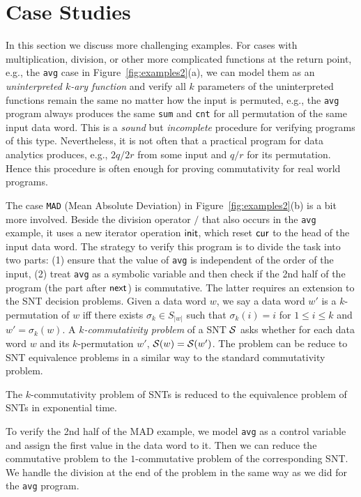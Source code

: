 \section{Case Studies}
\label{sec:cases}


In this section we discuss more challenging examples. 
For cases with multiplication, division, or other more complicated functions at the return point, e.g., the \texttt{avg} case in Figure~\ref{fig:examples2}(a), we can model them as an \emph{uninterpreted $k$-ary function} and verify all $k$ parameters of the uninterpreted functions remain the same no matter how the input is permuted, e.g., the \texttt{avg} program always produces the same \texttt{sum} and \texttt{cnt} for all permutation of the same input data word. This is a \emph{sound} but \emph{incomplete} procedure for verifying programs of this type. Nevertheless, it is not often that a  practical program for data analytics produces, e.g., $2q/2r$ from some input and $q/r$ for its permutation. Hence this procedure is often enough for proving commutativity for real world programs.

The case \texttt{MAD} (Mean Absolute Deviation) in Figure~\ref{fig:examples2}(b) is a bit more involved. Beside the division operator $/$ that also occurs in the \texttt{avg} example, it uses a new iterator operation $\mathsf{init}$, which reset $\mathsf{cur}$ to the head of the input data word. The strategy to verify this program is to divide the task into two parts: (1) ensure that the value of \texttt{avg} is independent of the order of the input, (2) treat \texttt{avg} as a symbolic variable and then check if the 2nd half of the program (the part after $\mathsf{next}$) is commutative. The latter requires an extension to the SNT decision problems. Given a data word $w$, we say a data word $w'$ is a $k$-permutation of $w$ iff there exists $\sigma_k\in S_{|w|}$ such that $\sigma_k(i)=i$ for $1\leq i\leq k$ and $w'=\sigma_k(w)$. A \emph{$k$-commutativity problem} of a SNT ${\mathcal{S} }$ asks whether for each data word $w$ and its $k$-permutation $w'$, ${\mathcal{S} }(w)={\mathcal{S} }(w')$. The problem can be reduce to SNT equivalence problems in a similar way to the standard commutativity problem.

\begin{proposition}\label{prop-snt-kcmm-to-eqv}
	The $k$-commutativity problem of SNTs is reduced to the equivalence problem of SNTs in exponential time. 
\end{proposition}

To verify the 2nd half of the MAD example, we model \texttt{avg} as a control variable and assign the first value in the data word to it. Then we can reduce the commutative problem to the $1$-commutative problem of the corresponding SNT. We handle the division at the end of the problem in the same way as we did for the \texttt{avg} program.

